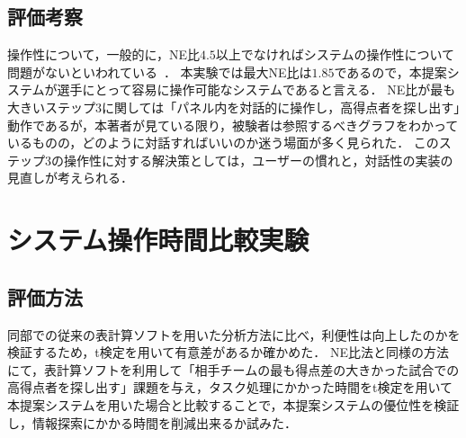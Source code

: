 \documentclass[sotsuron]{kuee}
\begin{document}
		\subsection{評価考察}
			操作性について，一般的に，NE比$4.5$以上でなければシステムの操作性について問題がないといわれている~\cite{NEMratio}．
			本実験では最大NE比は$1.85$であるので，本提案システムが選手にとって容易に操作可能なシステムであると言える．
			NE比が最も大きいステップ3に関しては「パネル内を対話的に操作し，高得点者を探し出す」動作であるが，本著者が見ている限り，被験者は参照するべきグラフをわかっているものの，どのように対話すればいいのか迷う場面が多く見られた．
			このステップ3の操作性に対する解決策としては，ユーザーの慣れと，対話性の実装の見直しが考えられる．
	\section{システム操作時間比較実験}
		\subsection{評価方法}
			同部での従来の表計算ソフトを用いた分析方法に比べ，利便性は向上したのかを検証するため，t検定を用いて有意差があるか確かめた．
			NE比法と同様の方法にて，表計算ソフトを利用して「相手チームの最も得点差の大きかった試合での高得点者を探し出す」課題を与え，タスク処理にかかった時間をt検定を用いて本提案システムを用いた場合と比較することで，本提案システムの優位性を検証し，情報探索にかかる時間を削減出来るか試みた．
\end{document}
